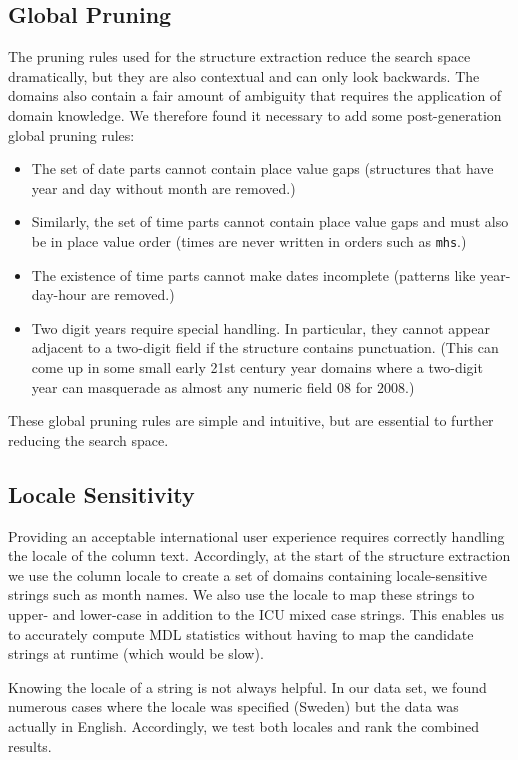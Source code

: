 \subsection{Global Pruning}
The pruning rules used for the structure extraction reduce the search space dramatically, but they are also contextual and can only look backwards. The domains also contain a fair amount of ambiguity that requires the application of domain knowledge. We therefore found it necessary to add some post-generation global pruning rules:
\begin{itemize}
\setlength\itemsep{0em}
\item The set of date parts cannot contain place value gaps (\eg structures that have year and day without month are removed.)
\item Similarly, the set of time parts cannot contain place value gaps and must also be in place value order (times are never written in orders such as \texttt{mhs}.)
\item The existence of time parts cannot make dates incomplete (\eg patterns like year-day-hour are removed.)
\item Two digit years require special handling. In particular, they cannot appear adjacent to a two-digit field if the structure contains punctuation. (This can come up in some small early 21st century year domains where a two-digit year can masquerade as almost any numeric field \eg $08$ for $2008$.)
\end{itemize}

These global pruning rules are simple and intuitive, but are essential to further reducing the search space.

\subsection{Locale Sensitivity}
Providing an acceptable international user experience requires correctly handling the locale of the column text. Accordingly, at the start of the structure extraction we use the column locale to create a set of domains containing locale-sensitive strings such as month names. We also use the locale to map these strings to upper- and lower-case in addition to the ICU mixed case strings. This enables us to accurately compute MDL statistics without having to map the candidate strings at runtime (which would be slow).

Knowing the locale of a string is not always helpful. In our data set, we found numerous cases where the locale was specified (\eg Sweden) but the data was actually in English. Accordingly, we test both locales and rank the combined results. 

